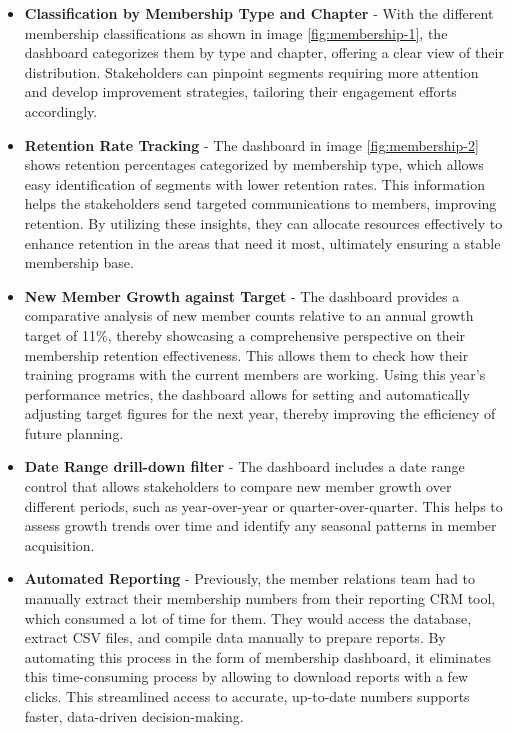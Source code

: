 \documentclass[11pt,a4paper,]{article}
\begin{document}
\begin{itemize}
\item
  \textbf{Classification by Membership Type and Chapter} - With the different membership classifications as shown in image \ref{fig:membership-1}, the dashboard categorizes them by type and chapter, offering a clear view of their distribution. Stakeholders can pinpoint segments requiring more attention and develop improvement strategies, tailoring their engagement efforts accordingly.
\item
  \textbf{Retention Rate Tracking} - The dashboard in image \ref{fig:membership-2} shows retention percentages categorized by membership type, which allows easy identification of segments with lower retention rates. This information helps the stakeholders send targeted communications to members, improving retention. By utilizing these insights, they can allocate resources effectively to enhance retention in the areas that need it most, ultimately ensuring a stable membership base.
\item
  \textbf{New Member Growth against Target} - The dashboard provides a comparative analysis of new member counts relative to an annual growth target of 11\%, thereby showcasing a comprehensive perspective on their membership retention effectiveness. This allows them to check how their training programs with the current members are working. Using this year's performance metrics, the dashboard allows for setting and automatically adjusting target figures for the next year, thereby improving the efficiency of future planning.
\item
  \textbf{Date Range drill-down filter} - The dashboard includes a date range control that allows stakeholders to compare new member growth over different periods, such as year-over-year or quarter-over-quarter. This helps to assess growth trends over time and identify any seasonal patterns in member acquisition.
\item
  \textbf{Automated Reporting} - Previously, the member relations team had to manually extract their membership numbers from their reporting CRM tool, which consumed a lot of time for them. They would access the database, extract CSV files, and compile data manually to prepare reports. By automating this process in the form of membership dashboard, it eliminates this time-consuming process by allowing to download reports with a few clicks. This streamlined access to accurate, up-to-date numbers supports faster, data-driven decision-making.
\end{itemize}
\end{document}
